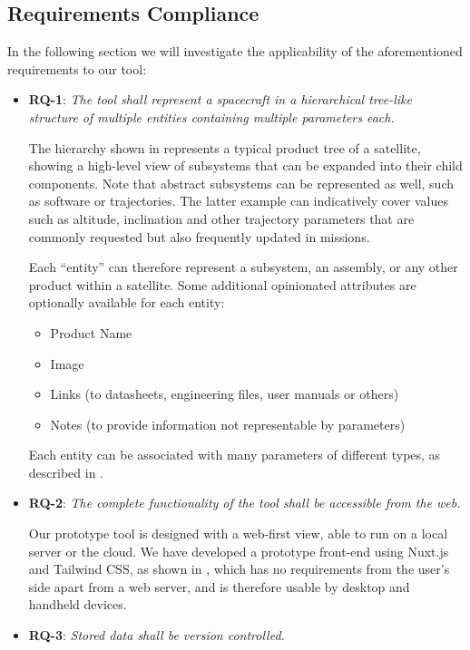 \documentclass[]{iac}
\begin{document}
\subsection{Requirements Compliance}
In the following section we will investigate the applicability of the aforementioned requirements to our tool:
\begin{itemize}[itemsep=6pt]
    \item \textbf{RQ-1}: \emph{The tool shall represent a spacecraft in a hierarchical tree-like structure of multiple entities containing multiple parameters each.}

    The hierarchy shown in  represents a typical product tree of a satellite, showing a high-level view of subsystems that can be expanded into their child components. Note that abstract subsystems can be represented as well, such as software or trajectories. The latter example can indicatively cover values such as altitude, inclination and other trajectory parameters that are commonly requested but also frequently updated in missions.

    Each ``entity'' can therefore represent a subsystem, an assembly, or any other product within a satellite.
    Some additional opinionated attributes are optionally available for each entity:
    \begin{itemize}[itemsep=0pt]
        \item Product Name
        \item Image
        \item Links (to datasheets, engineering files, user manuals or others)
        \item Notes (to provide information not representable by parameters)
    \end{itemize}

    Each entity can be associated with many parameters of different types, as described in .

    \item \textbf{RQ-2}: \emph{The complete functionality of the tool shall be accessible from the web.}

    Our prototype tool is designed with a web-first view, able to run on a local server or the cloud.  We have developed a prototype front-end using Nuxt.js and Tailwind CSS, as shown in , which has no requirements from the user's side apart from a web server, and is therefore usable by desktop and handheld devices.

    \item \textbf{RQ-3}: \emph{Stored data shall be version controlled.}


\end{itemize}
\end{document}
